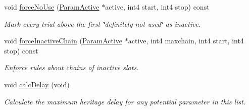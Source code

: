 \begin{DoxyCompactItemize}
void \mbox{\hyperlink{class_param_list_standard_a2027e18fbb90231abb775e04cca4ed97}{force\+No\+Use}} (\mbox{\hyperlink{class_param_active}{Param\+Active}} $\ast$active, int4 start, int4 stop) const
\begin{DoxyCompactList}\small\item\em Mark every trial above the first \char`\"{}definitely not used\char`\"{} as {\itshape inactive}. \end{DoxyCompactList}\item 
void \mbox{\hyperlink{class_param_list_standard_a551c148ffe5eb58a1f431b7e884f4de2}{force\+Inactive\+Chain}} (\mbox{\hyperlink{class_param_active}{Param\+Active}} $\ast$active, int4 maxchain, int4 start, int4 stop) const
\begin{DoxyCompactList}\small\item\em Enforce rules about chains of inactive slots. \end{DoxyCompactList}\item 
void \mbox{\hyperlink{class_param_list_standard_a0157393aeb32898f19740e548309d594}{calc\+Delay}} (void)
\begin{DoxyCompactList}\small\item\em Calculate the maximum heritage delay for any potential parameter in this list. \end{DoxyCompactList}\end{DoxyCompactItemize}
